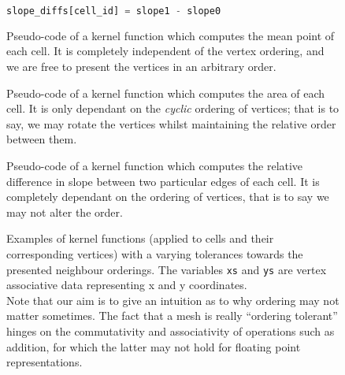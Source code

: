 \begin{figure}
\begin{lrbox}{\slopekernel}
\begin{lstlisting}[language=python]
	slope_diffs[cell_id] = slope1 - slope0
\end{lstlisting}
\end{lrbox}


\sidebysidethreeverticalnoncenter
{
	\usebox{\meankernel}
	\caption{Pseudo-code of a kernel function which computes the mean point of each cell. It is completely independent of the vertex ordering, and we are free to present the vertices in an arbitrary order.}
	\label{subfig:mean-kernel}
}
{
	\usebox{\areakernel}
	\caption{Pseudo-code of a kernel function which computes the area of each cell. It is only dependant on the \emph{cyclic} ordering of vertices; that is to say, we may rotate the vertices whilst maintaining the relative order between them.}
	\label{subfig:area-kernel}
}
{
	\usebox{\slopekernel}
	\label{subfig:slop-kernel}
	\caption{Pseudo-code of a kernel function which computes the relative difference in slope between two particular edges of each cell. It is completely dependant on the ordering of vertices, that is to say we may not alter the order.}
}
\caption{Examples of kernel functions (applied to cells and their corresponding vertices) with a varying tolerances towards the presented neighbour orderings. The variables \lstinline|xs| and \lstinline|ys| are vertex associative data representing x and y coordinates.\\Note that our aim is to give an intuition as to why ordering may not matter sometimes. The fact that a mesh is really ``ordering tolerant'' hinges on the commutativity and associativity of operations such as addition, for which the latter may not hold for floating point representations.}
\label{fig:kernel-orderings}
\end{figure}
